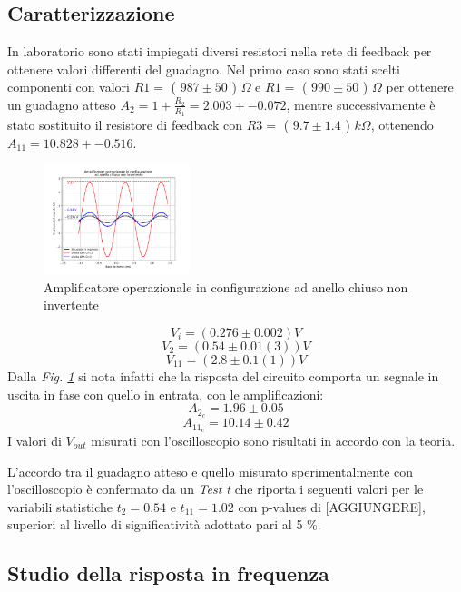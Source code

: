 \documentclass[journal]{IEEEtran}
\begin{document}
\subsection{\textbf{Caratterizzazione}}
In laboratorio sono stati impiegati diversi resistori nella rete di feedback per ottenere valori differenti del guadagno. Nel primo caso sono stati scelti componenti con valori
$R1 =$ ( $987 \pm 50$ ) $\Omega$ e $R1 =$ ( $990 \pm 50$ ) $\Omega$ 
per ottenere un guadagno atteso 
$A_2 = 1 + \frac{R_2}{R_1} =2.003 +- 0.072$, 
mentre successivamente è stato sostituito il resistore di feedback con 
$R3 =$ ( $9.7 \pm 1.4$ ) $k\Omega$, ottenendo $A_{11} = 10.828 +- 0.516 $.
\begin{figure}[H]%
\begin {center}
\includegraphics[width=0.38\textwidth]{analysis/output/OPA-closed-loop-non-inv-G2-11.pdf}
\caption{Amplificatore operazionale in configurazione ad anello chiuso non invertente}
\label{fig:g2-11}
\end {center}
\end{figure}
\[V_i = (0.276 \pm 0.002) V\]
\[V_2 = (0.54 \pm 0.01(3)) V\]
\[V_11 = (2.8 \pm 0.1(1)) V\]
Dalla \textit{Fig. \ref{fig:g2-11}} si nota infatti che la risposta del circuito comporta un segnale in uscita in fase con quello in entrata, con le amplificazioni:
\[A_{2_c} = 1.96 \pm 0.05\]
\[A_{11_c} = 10.14 \pm 0.42\]
 I valori di $V_{out}$ misurati con l'oscilloscopio sono risultati in accordo con la teoria.

L'accordo tra il guadagno atteso e quello misurato sperimentalmente con l'oscilloscopio è confermato da un \textit{Test t} che riporta i seguenti valori per le variabili statistiche $t_2 = 0.54$ e $t_{11} = 1.02$ con p-values di [AGGIUNGERE], superiori al livello di significatività adottato pari al 5 \%.

\subsection{Studio della risposta in frequenza}
\end{document}
